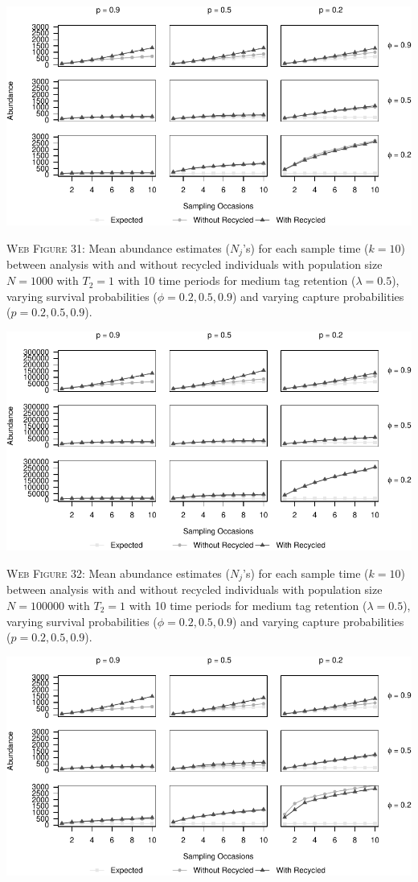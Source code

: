 \documentclass[]{article}
\begin{document}
\newpage

\includegraphics{Appendix_BW_files/figure-latex/31_abundance_M_GJSTL1-1.pdf}

\textsc{Web Figure 31:} Mean abundance estimates (\(N_j\)'s) for each
sample time (\(k=10\)) between analysis with and without recycled
individuals with population size \(N=1000\) with \(T_2=1\) with 10 time
periods for medium tag retention (\(\lambda=0.5\)), varying survival
probabilities (\(\phi=0.2,0.5,0.9\)) and varying capture probabilities
(\(p=0.2,0.5,0.9\)).

\includegraphics{Appendix_BW_files/figure-latex/32_abundance_M_GJSTL2-1.pdf}

\textsc{Web Figure 32:} Mean abundance estimates (\(N_j\)'s) for each
sample time (\(k=10\)) between analysis with and without recycled
individuals with population size \(N=100000\) with \(T_2=1\) with 10
time periods for medium tag retention (\(\lambda=0.5\)), varying
survival probabilities (\(\phi=0.2,0.5,0.9\)) and varying capture
probabilities (\(p=0.2,0.5,0.9\)).

\newpage

\includegraphics{Appendix_BW_files/figure-latex/33_abundance_M_GJSTL4-1.pdf}
\end{document}
